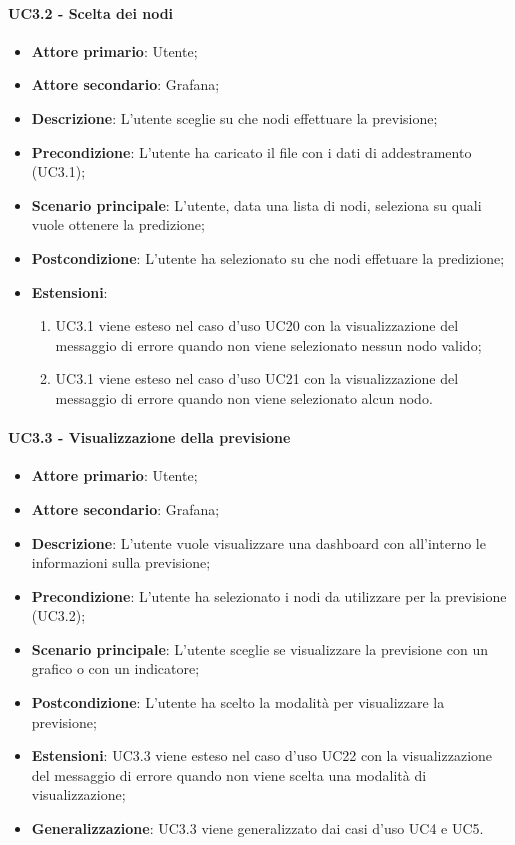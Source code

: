 \paragraph{UC3.2 - Scelta dei nodi}
\label{para:uc3.2}
\begin{itemize}
  \item \textbf{Attore primario}: Utente;
  \item \textbf{Attore secondario}: Grafana;
  \item \textbf{Descrizione}: L'utente sceglie su che nodi effettuare la previsione;
  \item \textbf{Precondizione}: L'utente ha caricato il file con i dati di addestramento (UC3.1);
  \item \textbf{Scenario principale}: L'utente, data una lista di nodi, seleziona su quali vuole ottenere la predizione;
  \item \textbf{Postcondizione}: L'utente ha selezionato su che nodi effetuare la predizione;
  \item \textbf{Estensioni}:
  \begin{enumerate}
    \item UC3.1 viene esteso nel caso d'uso UC20 con la visualizzazione del messaggio di errore quando non viene selezionato nessun nodo valido;
    \item UC3.1 viene esteso nel caso d'uso UC21 con la visualizzazione del messaggio di errore quando non viene selezionato alcun nodo.
    \end{enumerate}
\end{itemize}

\paragraph{UC3.3 - Visualizzazione della previsione}%
\label{para:uc3.3}
\begin{itemize}
  \item \textbf{Attore primario}: Utente;
  \item \textbf{Attore secondario}: Grafana;
  \item \textbf{Descrizione}: L'utente vuole visualizzare una dashboard con all'interno le informazioni sulla previsione;
  \item \textbf{Precondizione}: L'utente ha selezionato i nodi da utilizzare per la previsione (UC3.2);
  \item \textbf{Scenario principale}: L'utente sceglie se visualizzare la previsione con un grafico o con un indicatore;
  \item \textbf{Postcondizione}: L'utente ha scelto la modalità per visualizzare la previsione;
  \item \textbf{Estensioni}: UC3.3 viene esteso nel caso d'uso UC22 con la visualizzazione del messaggio di errore quando non viene scelta una modalità di visualizzazione;
  \item \textbf{Generalizzazione}: UC3.3 viene generalizzato dai casi d'uso UC4 e UC5.
\end{itemize}
